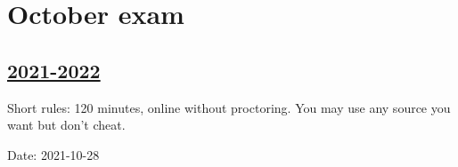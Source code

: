 
\newpage
\thispagestyle{empty}
\section{October exam}
 


\subsection[2021-2022]{\hyperref[sec:sol_kr_01_2021_2022]{2021-2022}}
\label{sec:kr_01_2021_2022} %

Short rules: 120 minutes, online without proctoring. You may use any source you want but don't cheat.

Date: 2021-10-28

